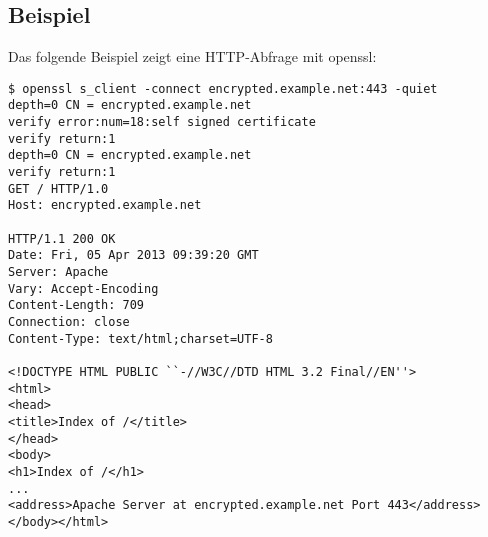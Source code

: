 \begin{normaltext}
  \subsection*{Beispiel}
  Das folgende Beispiel zeigt eine HTTP-Abfrage mit openssl:
  \begin{verbatim}
$ openssl s_client -connect encrypted.example.net:443 -quiet
depth=0 CN = encrypted.example.net
verify error:num=18:self signed certificate
verify return:1
depth=0 CN = encrypted.example.net
verify return:1
GET / HTTP/1.0
Host: encrypted.example.net

HTTP/1.1 200 OK
Date: Fri, 05 Apr 2013 09:39:20 GMT
Server: Apache
Vary: Accept-Encoding
Content-Length: 709
Connection: close
Content-Type: text/html;charset=UTF-8

<!DOCTYPE HTML PUBLIC ``-//W3C//DTD HTML 3.2 Final//EN''>
<html>
<head>
<title>Index of /</title>
</head>
<body>
<h1>Index of /</h1>
...
<address>Apache Server at encrypted.example.net Port 443</address>
</body></html>
  \end{verbatim}
\end{normaltext}



